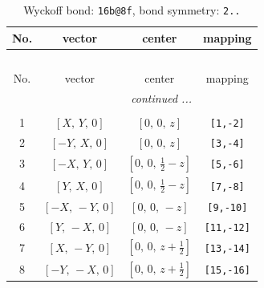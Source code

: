 \documentclass[fleqn,8pt]{jsarticle}
\begin{document}
\begin{longtable}{cccc}
\caption{Wyckoff bond: {\tt 16b@8f}, bond symmetry: {\tt 2..}}
 \\
 \hline \hline
No. & vector & center & mapping \\ \hline \endfirsthead

\multicolumn{3}{l}{\tablename\ \thetable{}} \\
 \hline \hline
No. & vector & center & mapping \\ \hline \endhead

 \hline \hline
\multicolumn{3}{r}{\footnotesize\it continued ...} \\ \endfoot

 \hline \hline
\multicolumn{3}{r}{} \\ \endlastfoot

1 & $\left[ X,\, Y,\, 0 \right]$ & $\left[ 0,\, 0,\, z \right]$ & {\tt [1,-2]} \\ \hline
2 & $\left[ - Y,\, X,\, 0 \right]$ & $\left[ 0,\, 0,\, z \right]$ & {\tt [3,-4]} \\ \hline
3 & $\left[ - X,\, Y,\, 0 \right]$ & $\left[ 0,\, 0,\, \frac{1}{2} - z \right]$ & {\tt [5,-6]} \\ \hline
4 & $\left[ Y,\, X,\, 0 \right]$ & $\left[ 0,\, 0,\, \frac{1}{2} - z \right]$ & {\tt [7,-8]} \\ \hline
5 & $\left[ - X,\, - Y,\, 0 \right]$ & $\left[ 0,\, 0,\, - z \right]$ & {\tt [9,-10]} \\ \hline
6 & $\left[ Y,\, - X,\, 0 \right]$ & $\left[ 0,\, 0,\, - z \right]$ & {\tt [11,-12]} \\ \hline
7 & $\left[ X,\, - Y,\, 0 \right]$ & $\left[ 0,\, 0,\, z + \frac{1}{2} \right]$ & {\tt [13,-14]} \\ \hline
8 & $\left[ - Y,\, - X,\, 0 \right]$ & $\left[ 0,\, 0,\, z + \frac{1}{2} \right]$ & {\tt [15,-16]} \\
\end{longtable}
\renewcommand{\arraystretch}{1.2}
\end{document}
